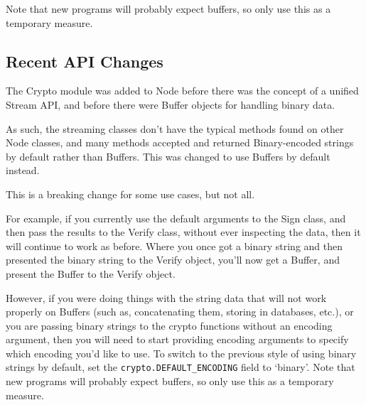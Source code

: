 Note that new programs will probably expect buffers, so only use this as
a temporary measure.

\subsection{Recent API Changes}\label{recent-api-changes}

The Crypto module was added to Node before there was the concept of a
unified Stream API, and before there were Buffer objects for handling
binary data.

As such, the streaming classes don't have the typical methods found on
other Node classes, and many methods accepted and returned
Binary-encoded strings by default rather than Buffers. This was changed
to use Buffers by default instead.

This is a breaking change for some use cases, but not all.

For example, if you currently use the default arguments to the Sign
class, and then pass the results to the Verify class, without ever
inspecting the data, then it will continue to work as before. Where you
once got a binary string and then presented the binary string to the
Verify object, you'll now get a Buffer, and present the Buffer to the
Verify object.

However, if you were doing things with the string data that will not
work properly on Buffers (such as, concatenating them, storing in
databases, etc.), or you are passing binary strings to the crypto
functions without an encoding argument, then you will need to start
providing encoding arguments to specify which encoding you'd like to
use. To switch to the previous style of using binary strings by default,
set the \texttt{crypto.DEFAULT\_ENCODING} field to `binary'. Note that
new programs will probably expect buffers, so only use this as a
temporary measure.
